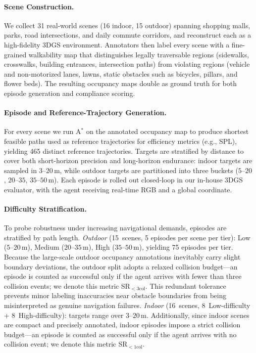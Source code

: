 \paragraph{Scene Construction.}
We collect 31 real-world scenes (16 indoor, 15 outdoor) spanning
shopping malls, parks, road intersections, and daily commute
corridors, and reconstruct each as a high-fidelity 3DGS
environment. Annotators then label every scene with a
fine-grained walkability map that distinguishes legally
traversable regions (sidewalks, crosswalks, building entrances,
intersection paths) from violating regions (vehicle and
non-motorized lanes, lawns, static obstacles such as bicycles,
pillars, and flower beds). The
resulting occupancy maps double as ground truth for both episode
generation and compliance scoring.

\paragraph{Episode and Reference-Trajectory Generation.}
For every scene we run A$^{\!*}$ on the annotated occupancy map to
produce shortest feasible paths used as reference trajectories for
efficiency metrics (e.g., SPL), yielding 465 distinct reference
trajectories.
Targets are stratified by distance
to cover both short-horizon precision and long-horizon endurance:
indoor targets are sampled in $3$--$20$\,m, while outdoor targets
are partitioned into three buckets ($5$--$20$, $20$--$35$,
$35$--$50$\,m). Each episode is rolled out closed-loop in our
in-house 3DGS evaluator, with the agent receiving real-time RGB
and a global coordinate.

\paragraph{Difficulty Stratification.}
To probe robustness under increasing navigational demands, episodes
are stratified by path length.
\emph{Outdoor} (15~scenes, 5 episodes per scene per tier):
Low ($5$--$20$\,m), Medium ($20$--$35$\,m), High ($35$--$50$\,m),
yielding 75 episodes per tier. Because the large-scale outdoor
occupancy annotations inevitably carry slight boundary deviations,
the outdoor split adopts a relaxed collision budget---an episode is
counted as successful only if the agent arrives with fewer than three
collision events; we denote this metric SR$_{<3\text{col}}$. This
redundant tolerance prevents minor labeling inaccuracies near
obstacle boundaries from being misinterpreted as genuine navigation
failures.
\emph{Indoor} (16~scenes, 8~Low-difficulty + 8~High-difficulty):
targets range over $3$--$20$\,m.  Additionally, since indoor scenes
are compact and precisely annotated, indoor episodes
impose a strict collision budget---an episode is counted as
successful only if the agent arrives with no collision
event; we denote this metric SR$_{<1\text{col}}$.

